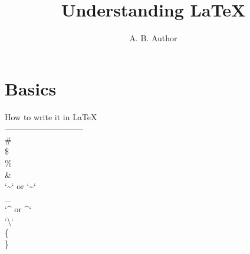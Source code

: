 \documentclass[12pt]{book}
\begin{document}
\title{Understanding LaTeX}
\author{A. B. Author}
\date{}

\maketitle

\chapter{Basics}

\begin{center}
    
How to write it in LaTeX      \\
-----------------------------  \\
\#               \\           
\$                 \\         
\%                \\          
\&                \\          
`\textasciitilde{}` or `\~{}` \\
\_                          \\
`\^{} or \textasciicircum{}`  \\
`\textbackslash{}`            \\
\{                          \\
\}                          \\
\end{center}
\end{document}
